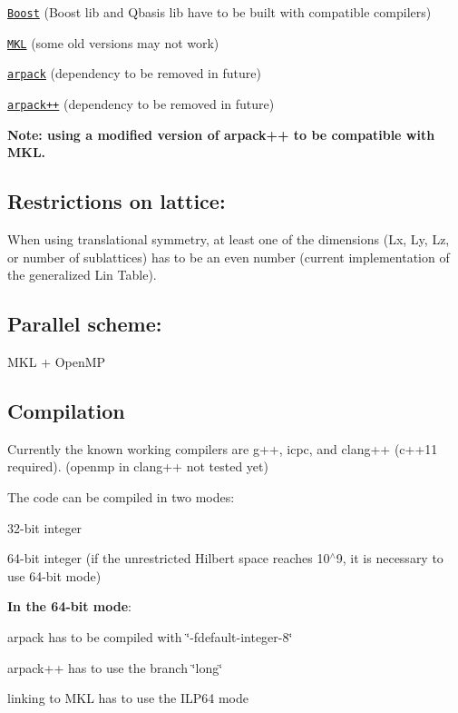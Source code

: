 \begin{DoxyItemize}
\item \href{http://www.boost.org/}{\tt Boost} (Boost lib and Qbasis lib have to be built with compatible compilers)
\item \href{https://software.intel.com/en-us/intel-mkl}{\tt M\+KL} (some old versions may not work)
\item \href{https://github.com/opencollab/arpack-ng}{\tt arpack} (dependency to be removed in future)
\item \href{https://github.com/wztzjhn/arpackpp}{\tt arpack++} (dependency to be removed in future)
\end{DoxyItemize}

{\bfseries Note\+: using a modified version of arpack++ to be compatible with M\+KL.}

\subsection*{Restrictions on lattice\+:}

When using translational symmetry, at least one of the dimensions (Lx, Ly, Lz, or number of sublattices) has to be an even number (current implementation of the generalized Lin Table).

\subsection*{Parallel scheme\+:}

M\+KL + Open\+MP

\subsection*{Compilation}

Currently the known working compilers are g++, icpc, and clang++ (c++11 required). (openmp in clang++ not tested yet)

The code can be compiled in two modes\+:
\begin{DoxyItemize}
\item 32-\/bit integer
\item 64-\/bit integer (if the unrestricted Hilbert space reaches 10$^\wedge$9, it is necessary to use 64-\/bit mode)
\end{DoxyItemize}

{\bfseries In the 64-\/bit mode}\+:
\begin{DoxyItemize}
\item arpack has to be compiled with \char`\"{}-\/fdefault-\/integer-\/8\char`\"{}
\item arpack++ has to use the branch \char`\"{}long\char`\"{}
\item linking to M\+KL has to use the I\+L\+P64 mode 
\end{DoxyItemize}